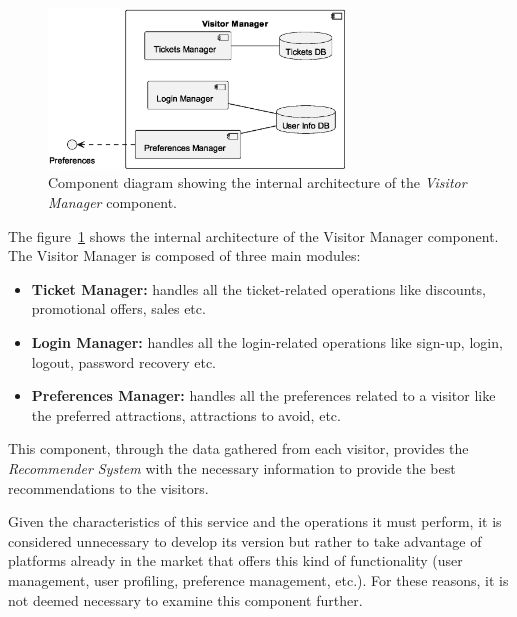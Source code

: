 \begin{figure}[H]
	\centering
	\includegraphics[width=0.7\textwidth]{img/visitor-manager.eps}
	\caption{Component diagram showing the internal architecture of the \textit{Visitor Manager} component.
	}
	\label{fig:visitor-manager-arch}
\end{figure}

The figure~\ref{fig:visitor-manager-arch} shows the internal architecture of the Visitor Manager component. The Visitor Manager is composed of three main modules:

\begin{itemize}
	\item \textbf{Ticket Manager:} handles all the ticket-related operations like discounts, promotional offers, sales etc.
	\item \textbf{Login Manager:} handles all the login-related operations like sign-up, login, logout, password recovery etc.
	\item \textbf{Preferences Manager:} handles all the preferences related to a visitor like the preferred attractions, attractions to avoid, etc.
\end{itemize}

This component, through the data gathered from each visitor, provides the \textit{Recommender System} with the necessary information to provide the best recommendations to the visitors.

Given the characteristics of this service and the operations it must perform, it is considered unnecessary to develop its version but rather to
take advantage of platforms already in the market that offers this kind of functionality (user management, user profiling, preference management,
etc.). For these reasons, it is not deemed necessary to examine this component further.
